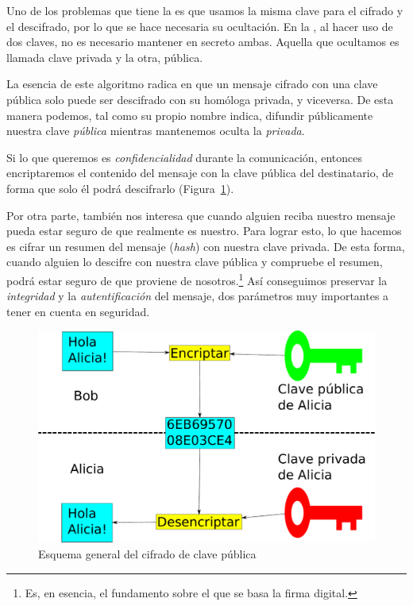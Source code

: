 Uno de los problemas que tiene la  es que usamos la misma clave para el cifrado y el descifrado, por lo que se hace necesaria su ocultación.
En la , al hacer uso de dos claves, no es necesario mantener en secreto ambas. Aquella que ocultamos es llamada clave privada y la otra, pública.

La esencia de este algoritmo radica en que un mensaje cifrado con una clave pública solo puede ser descifrado con su homóloga privada, y viceversa.
De esta manera podemos, tal como su propio nombre indica, difundir públicamente nuestra clave \emph{pública} mientras mantenemos oculta la \emph{privada}.

Si lo que queremos es \emph{confidencialidad} durante la comunicación, entonces encriptaremos el contenido del mensaje con la clave pública del destinatario, de forma que solo él podrá descifrarlo (Figura~\ref{fig:PublicKeyEncryption}).

Por otra parte, también nos interesa que cuando alguien reciba nuestro mensaje pueda estar seguro de que realmente es nuestro.
Para lograr esto, lo que hacemos es cifrar un resumen del mensaje (\emph{hash}) con nuestra clave privada.
De esta forma, cuando alguien lo descifre con nuestra clave pública y compruebe el resumen, podrá estar seguro de que proviene de nosotros.\footnote{Es, en esencia, el fundamento sobre el que se basa la firma digital.}
Así conseguimos preservar la \emph{integridad} y la \emph{autentificación} del mensaje, dos parámetros muy importantes a tener en cuenta en seguridad. \emph{\parencite{Reference14}}

\begin{figure}[ht]
  \centering
  \includegraphics[scale=0.3]{Figures/PublicKeyEncryption}
  \decoRule
  \caption[Cifrado de clave pública (Esquema)]{Esquema general del cifrado de clave pública}
  \label{fig:PublicKeyEncryption}
\end{figure}

